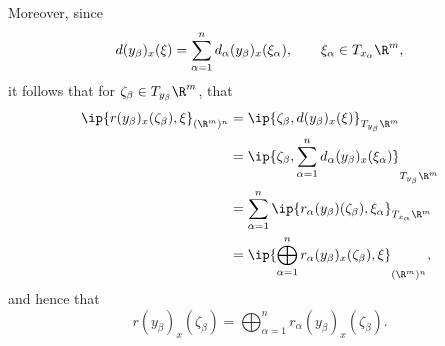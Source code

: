 \begin{comment}
Then after direct-summing over $\alpha$, we conclude that for $(x,\xi)\in T(\R^m)^n$,
{\scriptsize
\begin{align*}
	d(y_\beta)_x(\xi)&=\bigoplus_{\alpha=1}^nd_\alpha(y_\beta)_x(\xi_\alpha)\\
	&=\bigoplus_{\alpha=1}^n\left[\delta_{\alpha\beta}(\sigma^2+\vec{\epsilon})^{\odot-\frac{1}{2}}-\frac{1}{n}(\sigma^2+\vec{\epsilon})^{\odot-\frac{1}{2}}-\frac{1}{n}(\sigma^2+\vec{\epsilon})^{\odot-\frac{3}{2}}\dot(x_\beta-\mu)\odot(x_\alpha-\mu)\right]\odot\xi_\alpha\\
	&=\sum_{j=1}^n\delta_{j\beta}(\sigma^2+\vec{\epsilon})^{\odot-\frac{1}{2}}\odot\xi_j-\frac{1}{n}\sum_{j=1}^n(\sigma^2+\vec{\epsilon})^{\odot-\frac{1}{2}}\odot\xi_j\\
	&\qquad-\frac{1}{n}\sum_{j=1}^n(\sigma^2+\vec{\epsilon})^{\odot-\frac{3}{2}}\odot(x_\beta-\mu)\odot(x_j-\mu)\odot\xi_j\\
	&=(\sigma^2+\vec{\epsilon})^{\odot-\frac{1}{2}}\odot\xi_\beta-\frac{1}{n}(\sigma^2+\vec{\epsilon})^{\odot-\frac{1}{2}}\odot\sum_{j=1}^n\xi_j\\
	&\qquad-\frac{1}{n}(\sigma^2+\vec{\epsilon})^{\odot-1}\odot y_\beta\odot\sum_{j=1}^n(x_j-\mu)\odot\xi_j\\
	&=\theta\odot\xi_\beta-\frac{1}{n}\theta\odot\sum_{j=1}^n\xi_j-\frac{1}{n}\theta^2\odot y_\beta\odot\sum_{j=1}^n(x_j-\mu)\odot\xi_j,
\end{align*}
}
where
$$\theta=(\sigma^2+\vec{\epsilon})^{\odot-\frac{1}{2}},\qquad\theta^2=\theta^{\odot2}.$$

\end{comment}


Moreover, since
$$d(y_\beta)_x(\xi)=\sum_{\alpha=1}^nd_\alpha(y_\beta)_x(\xi_\alpha),\qquad\xi_\alpha\in T_{x_\alpha}\R^m,$$
it follows that for $\zeta_\beta\in T_{y_\beta}\R^m$, that
\begin{align*}
	\ip{r(y_\beta)_x(\zeta_\beta),\xi}_{(\R^m)^n}&=\ip{\zeta_\beta,d(y_\beta)_x(\xi)}_{T_{y_\beta}\R^m}\\
	&=\ip{\zeta_\beta,\sum_{\alpha=1}^nd_\alpha(y_\beta)_x(\xi_\alpha)}_{T_{y_\beta}\R^m}\\
	&=\sum_{\alpha=1}^n\ip{r_\alpha(y_\beta)(\zeta_\beta),\xi_\alpha}_{T_{x_\alpha}\R^m}\\
	&=\ip{\bigoplus_{\alpha=1}^nr_\alpha(y_\beta)_x(\zeta_\beta),\xi}_{(\R^m)^n},
\end{align*}
and hence that
$$r(y_\beta)_x(\zeta_\beta)=\bigoplus_{\alpha=1}^nr_\alpha(y_\beta)_x(\zeta_\beta).$$

